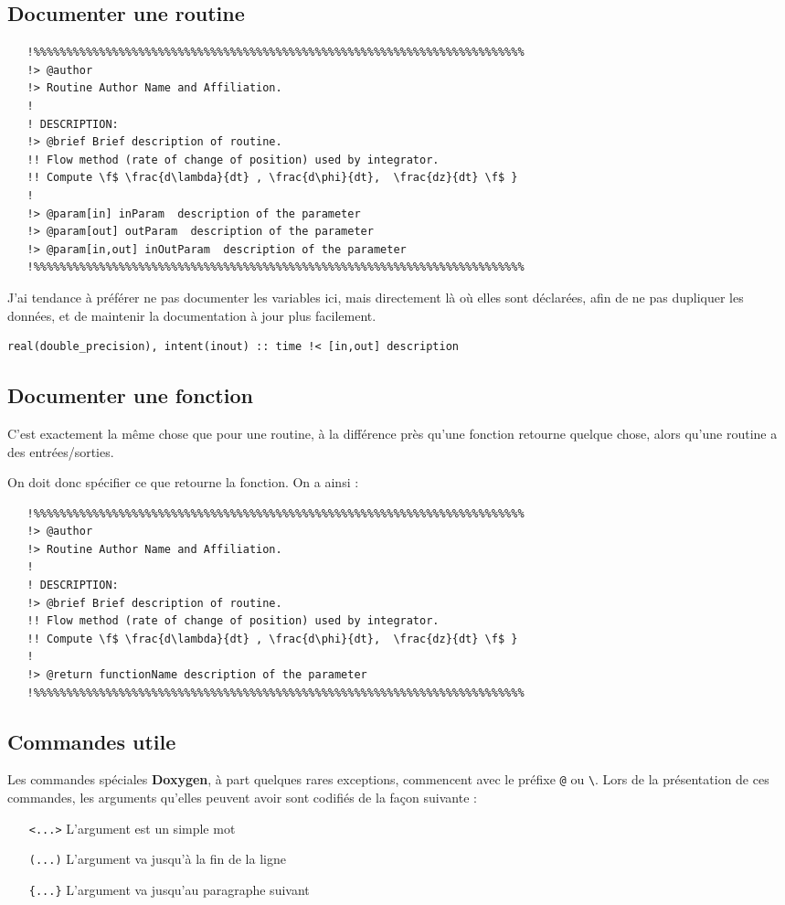 \documentclass[a4paper,twoside]{article}
\begin{document}
\subsection{Documenter une routine}
\begin{verbatim}
   !%%%%%%%%%%%%%%%%%%%%%%%%%%%%%%%%%%%%%%%%%%%%%%%%%%%%%%%%%%%%%%%%%%%%%%%%%%%
   !> @author 
   !> Routine Author Name and Affiliation.
   !
   ! DESCRIPTION: 
   !> @brief Brief description of routine. 
   !! Flow method (rate of change of position) used by integrator.
   !! Compute \f$ \frac{d\lambda}{dt} , \frac{d\phi}{dt},  \frac{dz}{dt} \f$ }
   !
   !> @param[in] inParam  description of the parameter
   !> @param[out] outParam  description of the parameter
   !> @param[in,out] inOutParam  description of the parameter 
   !%%%%%%%%%%%%%%%%%%%%%%%%%%%%%%%%%%%%%%%%%%%%%%%%%%%%%%%%%%%%%%%%%%%%%%%%%%% 
\end{verbatim}

J'ai tendance à préférer ne pas documenter les variables ici, mais directement là où elles sont déclarées, afin de ne pas dupliquer les données, et de maintenir la documentation à jour plus facilement.
\begin{verbatim}
real(double_precision), intent(inout) :: time !< [in,out] description
\end{verbatim}

\subsection{Documenter une fonction}
C'est exactement la même chose que pour une routine, à la différence près qu'une fonction retourne quelque chose, alors qu'une routine a des entrées/sorties. 

On doit donc spécifier ce que retourne la fonction. On a ainsi : 
\begin{verbatim}
   !%%%%%%%%%%%%%%%%%%%%%%%%%%%%%%%%%%%%%%%%%%%%%%%%%%%%%%%%%%%%%%%%%%%%%%%%%%%
   !> @author 
   !> Routine Author Name and Affiliation.
   !
   ! DESCRIPTION: 
   !> @brief Brief description of routine. 
   !! Flow method (rate of change of position) used by integrator.
   !! Compute \f$ \frac{d\lambda}{dt} , \frac{d\phi}{dt},  \frac{dz}{dt} \f$ }
   !
   !> @return functionName description of the parameter
   !%%%%%%%%%%%%%%%%%%%%%%%%%%%%%%%%%%%%%%%%%%%%%%%%%%%%%%%%%%%%%%%%%%%%%%%%%%% 
\end{verbatim}

\subsection{Commandes utile}
Les commandes spéciales \textbf{Doxygen}, à part quelques rares exceptions, commencent avec le préfixe \verb|@| ou \verb|\|. Lors de la présentation de ces commandes, les arguments qu'elles peuvent avoir sont codifiés de la façon suivante : 
\begin{itemize}
\item[\texttt{<...>}] L'argument est un simple mot
\item[\texttt{(...)}] L'argument va jusqu'à la fin de la ligne
\item[\texttt{\{...\}}] L'argument va jusqu'au paragraphe suivant
\end{itemize}
\end{document}
